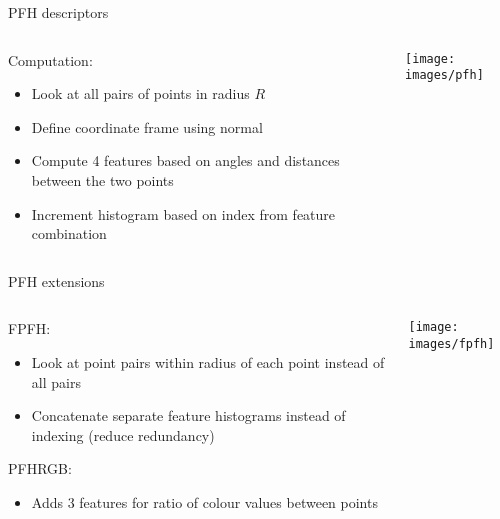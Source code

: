 \documentclass{beamer}
\begin{document}
\begin{frame}{PFH descriptors}
    \begin{columns}
    \begin{column}{0.5\textwidth}
      Computation:
      \begin{itemize}
      \item Look at all pairs of points in radius $R$
      \item Define coordinate frame using normal
      \item Compute 4 features based on angles and distances between the two points
      \item Increment histogram based on index from feature combination
      \end{itemize}
    \end{column}
    \begin{column}{0.5\textwidth}
      \texttt{[image: images/pfh]}
    \end{column}
  \end{columns}
\end{frame}
\begin{frame}{PFH extensions}
    \begin{columns}
    \begin{column}{0.5\textwidth}
      FPFH:
      \begin{itemize}
      \item Look at point pairs within radius of each point instead of all pairs
      \item Concatenate separate feature histograms instead of indexing (reduce redundancy)
      \end{itemize}
      PFHRGB:
      \begin{itemize}
      \item Adds 3 features for ratio of colour values between points
      \end{itemize}
    \end{column}
    \begin{column}{0.5\textwidth}
      \texttt{[image: images/fpfh]}
    \end{column}
  \end{columns}
\end{frame}
\end{document}
